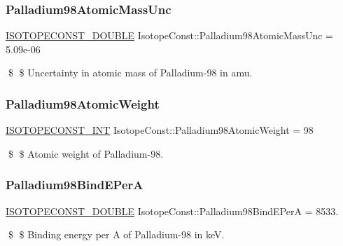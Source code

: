\subsubsection{\texorpdfstring{Palladium98\+Atomic\+Mass\+Unc}{Palladium98AtomicMassUnc}}
{\footnotesize\ttfamily \mbox{\hyperlink{group___isotope_const-_macros_ga8f45a7272ce02c0b4c65c44636ed719a}{I\+S\+O\+T\+O\+P\+E\+C\+O\+N\+S\+T\+\_\+\+D\+O\+U\+B\+LE}} Isotope\+Const\+::\+Palladium98\+Atomic\+Mass\+Unc = 5.\+09e-\/06}

\$ \$ Uncertainty in atomic mass of Palladium-\/98 in amu. \mbox{\label{group___isotope_const-_palladium-_pd98_ga71953194eb5ad03d4f0fea3dfb26d5f1}} 
\subsubsection{\texorpdfstring{Palladium98\+Atomic\+Weight}{Palladium98AtomicWeight}}
{\footnotesize\ttfamily \mbox{\hyperlink{group___isotope_const-_macros_ga5f18360b3e99483a35c32d789e62621c}{I\+S\+O\+T\+O\+P\+E\+C\+O\+N\+S\+T\+\_\+\+I\+NT}} Isotope\+Const\+::\+Palladium98\+Atomic\+Weight = 98}

\$ \$ Atomic weight of Palladium-\/98. \mbox{\label{group___isotope_const-_palladium-_pd98_ga1530c6e2c924ddf31cf7ed059014abc9}} 
\subsubsection{\texorpdfstring{Palladium98\+Bind\+E\+PerA}{Palladium98BindEPerA}}
{\footnotesize\ttfamily \mbox{\hyperlink{group___isotope_const-_macros_ga8f45a7272ce02c0b4c65c44636ed719a}{I\+S\+O\+T\+O\+P\+E\+C\+O\+N\+S\+T\+\_\+\+D\+O\+U\+B\+LE}} Isotope\+Const\+::\+Palladium98\+Bind\+E\+PerA = 8533.}

\$ \$ Binding energy per A of Palladium-\/98 in keV. \mbox{\label{group___isotope_const-_palladium-_pd98_gac32aa1f365f5cb4bf38c6ab89b693fd6}} 
